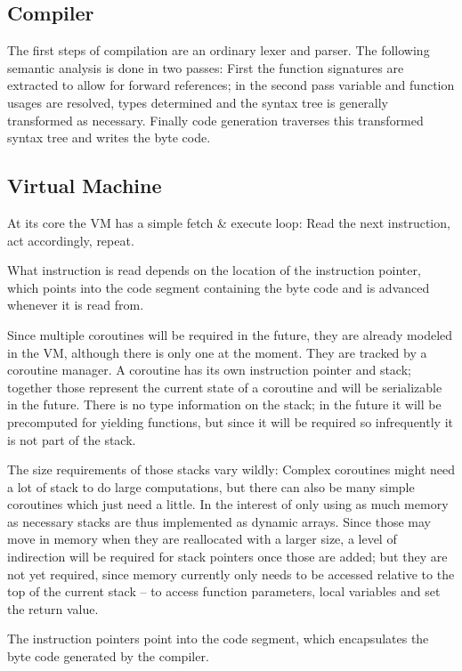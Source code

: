 		\subsection{Compiler}
			
			The first steps of compilation are an ordinary lexer and parser. The following semantic analysis is done in two passes: First the function signatures are extracted to allow for forward references; in the second pass variable and function usages are resolved, types determined and the syntax tree is generally transformed as necessary. Finally code generation traverses this transformed syntax tree and writes the byte code.
			
		\subsection{Virtual Machine}
			
			At its core the VM has a simple fetch \& execute loop: Read the next instruction, act accordingly, repeat.
			
			What instruction is read depends on the location of the instruction pointer, which points into the code segment containing the byte code and is advanced whenever it is read from.
			
			Since multiple coroutines will be required in the future, they are already modeled in the VM, although there is only one at the moment. They are tracked by a coroutine manager. A coroutine has its own instruction pointer and stack; together those represent the current state of a coroutine and will be serializable in the future. There is no type information on the stack; in the future it will be precomputed for yielding functions, but since it will be required so infrequently it is not part of the stack.
			
			The size requirements of those stacks vary wildly: Complex coroutines might need a lot of stack to do large computations, but there can also be many simple coroutines which just need a little. In the interest of only using as much memory as necessary stacks are thus implemented as dynamic arrays. Since those may move in memory when they are reallocated with a larger size, a level of indirection will be required for stack pointers once those are added; but they are not yet required, since memory currently only needs to be accessed relative to the top of the current stack -- to access function parameters, local variables and set the return value.
			
			The instruction pointers point into the code segment, which encapsulates the byte code generated by the compiler.
			
